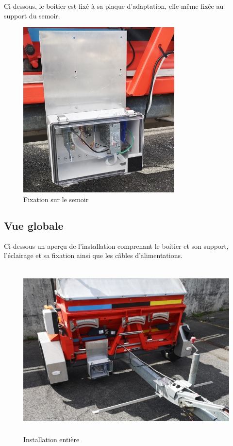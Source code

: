 Ci-dessous, le boitier est fixé à sa plaque d'adaptation, elle-même fixée au support du semoir.

\begin{figure}[H]
    \centering
    \includegraphics[height=9cm]{assets/figures/boitier_adaptation.jpg}
    \caption{Fixation sur le semoir}
\end{figure}

\subsection{Vue globale}
Ci-dessous un aperçu de l'installation comprenant le boitier et son support, l'éclairage et sa fixation ainsi que les câbles d'alimentations.
\begin{figure}[H]
    \centering
    \includegraphics[height=9cm]{assets/figures/installation_globale.jpg}
    \caption{Installation entière}
\end{figure}